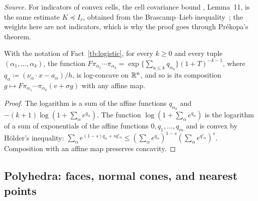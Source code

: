 \emph{Source.} For indicators of convex cells, the cell covariance bound
, Lemma~11, is the same estimate \(K\preceq I_r\), obtained from the
Brascamp--Lieb inequality~; the weights here are not indicators,
which is why the proof goes through Pr\'ekopa's theorem.

\begin{fact}\label{tb:lc-weights}
With the notation of Fact~\ref{tb:logistic}, for every \(k\ge0\) and every
tuple \((\alpha_1,\ldots,\alpha_k)\), the function
\(F\pi_{\alpha_1}\cdots\pi_{\alpha_k}=\exp\{\sum_{a\le k}q_{\alpha_a}\}
(1+T)^{-k-1}\), where \(q_\alpha\coloneqq (\nu_\alpha\cdot x-a_\alpha)/h\), is
log-concave on \(\mathbb R^n\), and so is its composition
\(g\mapsto F\pi_{\alpha_1}\cdots\pi_{\alpha_k}(v+\sigma g)\) with any affine map.
\end{fact}

\begin{proof}
The logarithm is a sum of the affine functions \(q_{\alpha_a}\) and
\(-(k+1)\log(1+\sum_\alpha e^{q_\alpha})\). The function
\(\log(1+\sum_\alpha e^{q_\alpha})\) is the logarithm of a sum of
exponentials of the affine functions \(0,q_1,\ldots,q_m\) and is convex by
H\"older's inequality: \(\sum_\alpha e^{(1-s)q_\alpha+sq'_\alpha}\le
(\sum_\alpha e^{q_\alpha})^{1-s}(\sum_\alpha e^{q'_\alpha})^s\). Composition
with an affine map preserves concavity.
\end{proof}


\subsection{Polyhedra: faces, normal cones, and nearest points}\label{tb:sec:poly}

